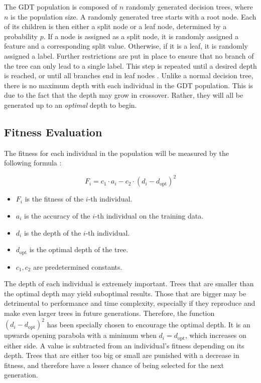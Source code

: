 \documentclass[12pt]{article}
\begin{document}
The GDT population is composed of $n$ randomly generated decision trees, where $n$ is the population size. A randomly generated tree starts with a root node. Each of its children is then either a split node or a leaf node, determined by a probability $p$. If a node is assigned as a split node, it is randomly assigned a feature and a corresponding split value. Otherwise, if it is a leaf, it is randomly assigned a label. Further restrictions are put in place to ensure that no branch of the tree can only lead to a single label. This step is repeated until a desired depth is reached, or until all branches end in leaf nodes \cite{faik_2020}. Unlike a normal decision tree, there is no maximum depth with each individual in the GDT population. This is due to the fact that the depth may grow in crossover. Rather, they will all be generated up to an \textit{optimal} depth to begin.

\subsection{Fitness Evaluation}

The fitness for each individual in the population will be measured by the following formula \cite{faik_2020}:

\[ F_i = c_1 \cdot a_i - c_2 \cdot (d_i - d_\text{opt})^2 \]

\begin{itemize}
    \item $F_i$ is the fitness of the $i$-th individual.
    \item $a_i$ is the accuracy of the $i$-th individual on the training data.
    \item $d_i$ is the depth of the $i$-th individual.
    \item $d_\text{opt}$ is the optimal depth of the tree.
    \item $c_1, c_2$ are predetermined constants.
\end{itemize}

The depth of each individual is extremely important. Trees that are smaller than the optimal depth may yield suboptimal results. Those that are bigger may be detrimental to performance and time complexity, especially if they reproduce and make even larger trees in future generations. Therefore, the function $(d_i - d_\text{opt})^2$ has been specially chosen to encourage the optimal depth. It is an upwards opening parabola with a minimum when $d_i = d_\text{opt}$, which increases on either side. A value is subtracted from an individual's fitness depending on its depth. Trees that are either too big or small are punished with a decrease in fitness, and therefore have a lesser chance of being selected for the next generation.
\end{document}
